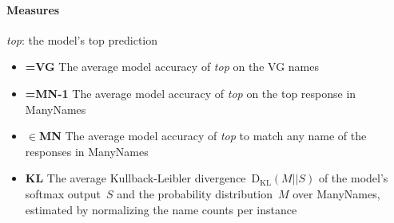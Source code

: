 \paragraph{Measures}
\textsl{top}: the model's top prediction
\begin{itemize}
	\item \textbf{=VG} The average model accuracy of \textsl{top} on the VG names
	\item \textbf{=MN-1} The average model accuracy of \textsl{top} on the top response in ManyNames
	\item \textbf{$\in$MN} The average model accuracy of \textsl{top} to match any name of the responses in ManyNames
	\item \textbf{KL} The average Kullback-Leibler divergence~$\mathrm{D_{KL}}(M||S)$ of the model's softmax output~$S$ and the  probability distribution~$M$ over ManyNames, estimated by normalizing the name counts per instance
\end{itemize}



